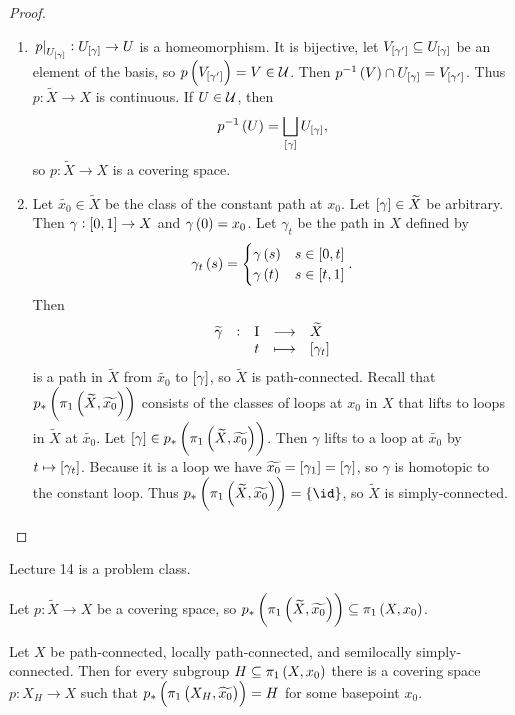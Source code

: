 \begin{proof}
\begin{enumerate}
\begin{itemize}
\end{itemize}
\item $ \eval{p}_{U_{\sbr{\gamma}}} : U_{\sbr{\gamma}} \to U $ is a homeomorphism. It is bijective, let $ V_{\sbr{\gamma'}} \subseteq U_{\sbr{\gamma}} $ be an element of the basis, so $ p\br{V_{\sbr{\gamma'}}} = V \in \UUU $. Then $ p^{-1}\br{V} \cap U_{\sbr{\gamma}} = V_{\sbr{\gamma'}} $. Thus $ p : \widetilde{X} \to X $ is continuous. If $ U \in \mathcal{U} $, then
$$ p^{-1}\br{U} = \bigsqcup_{\sbr{\gamma}} U_{\sbr{\gamma}}, $$
so $ p : \widetilde{X} \to X $ is a covering space.
\item Let $ \widetilde{x_0} \in \widetilde{X} $ be the class of the constant path at $ x_0 $. Let $ \sbr{\gamma} \in \widetilde{X} $ be arbitrary. Then $ \gamma : \sbr{0, 1} \to X $ and $ \gamma\br{0} = x_0 $. Let $ \gamma_t $ be the path in $ X $ defined by
$$ \gamma_t\br{s} =
\begin{cases}
\gamma\br{s} & s \in \sbr{0, t} \\
\gamma\br{t} & s \in \sbr{t, 1}
\end{cases}.
$$
Then
$$ \function[\widetilde{\gamma}]{\I}{\widetilde{X}}{t}{\sbr{\gamma_t}} $$
is a path in $ \widetilde{X} $ from $ \widetilde{x_0} $ to $ \sbr{\gamma} $, so $ \widetilde{X} $ is path-connected. Recall that $ p_*\br{\pi_1\br{\widetilde{X}, \widetilde{x_0}}} $ consists of the classes of loops at $ x_0 $ in $ X $ that lifts to loops in $ \widetilde{X} $ at $ \widetilde{x_0} $. Let $ \sbr{\gamma} \in p_*\br{\pi_1\br{\widetilde{X}, \widetilde{x_0}}} $. Then $ \gamma $ lifts to a loop at $ \widetilde{x_0} $ by $ t \mapsto \sbr{\gamma_t} $. Because it is a loop we have $ \widetilde{x_0} = \sbr{\gamma_1} = \sbr{\gamma} $, so $ \gamma $ is homotopic to the constant loop. Thus $ p_*\br{\pi_1\br{\widetilde{X}, \widetilde{x_0}}} = \cbr{\id} $, so $ \widetilde{X} $ is simply-connected.
\end{enumerate}
\end{proof}


Lecture 14 is a problem class.

\pagebreak


Let $ p : \widetilde{X} \to X $ be a covering space, so $ p_*\br{\pi_1\br{\widetilde{X}, \widetilde{x_0}}} \subseteq \pi_1\br{X, x_0} $.

\begin{proposition}
\label{prop:1.36}
Let $ X $ be path-connected, locally path-connected, and semilocally simply-connected. Then for every subgroup $ H \subseteq \pi_1\br{X, x_0} $ there is a covering space $ p : X_H \to X $ such that $ p_*\br{\pi_1\br{X_H, \widetilde{x_0}}} = H $ for some basepoint $ x_0 $.
\end{proposition}

